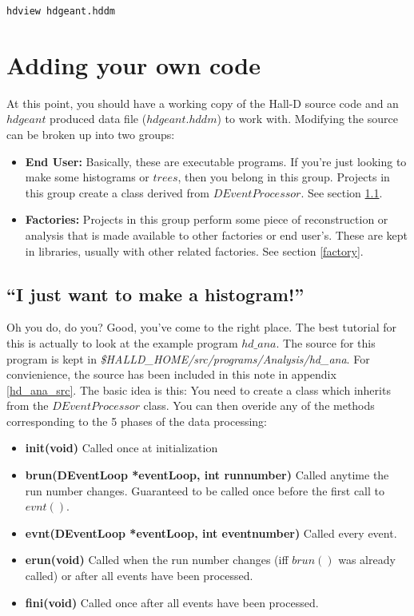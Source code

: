 \documentclass[12pt]{article}
\begin{document}
\begin{lstlisting}[frame=shadowbox,backgroundcolor=\color{cmdbkgd}]
hdview hdgeant.hddm
\end{lstlisting}


\section{Adding your own code}
At this point, you should have a working copy of the Hall-D source 
code and an $hdgeant$ produced data file ($hdgeant.hddm$) to work with.
Modifying the source can be broken up into two groups:
\begin{itemize}
	\item{\bf End User:} Basically, these are executable programs. If
	you're just looking to make some histograms or $trees$, then
	you belong in this group. Projects in this group create a class
	derived from $DEventProcessor$. See section \ref{enduser}.
	
	\item{\bf Factories:} Projects in this group perform some piece
	of reconstruction or analysis that is made available to other
	factories or end user's. These are kept in libraries, usually with
	other related factories. See section \ref{factory}.
\end{itemize}

\subsection{``I just want to make a histogram!''}
\label{enduser}
Oh you do, do you? Good, you've come to the right place. The best
tutorial for this is actually to look at the example program $hd\_ana$. The
source for this program is kept in
{\it \$HALLD\_HOME/src/programs/Analysis/hd\_ana}. For convienience, the
source has been included in this note in appendix \ref{hd_ana_src}.
The basic idea is
this: You need to create a class which inherits from the $DEventProcessor$
class. You can then overide any of the methods corresponding to the 5 phases
of the data processing:

\begin{itemize}
	\item{\bf init(void)} Called once at initialization
	\item{\bf brun(DEventLoop *eventLoop, int runnumber)} Called anytime the run number changes.
	 Guaranteed to be called once before the first call to $evnt()$.
	\item{\bf evnt(DEventLoop *eventLoop, int eventnumber)} Called every event.
	\item{\bf erun(void)} Called when the run number changes (iff $brun()$
	 was already called) or after all events have been processed.
	\item{\bf fini(void)} Called once after all events have been processed.
\end{itemize}
\end{document}
